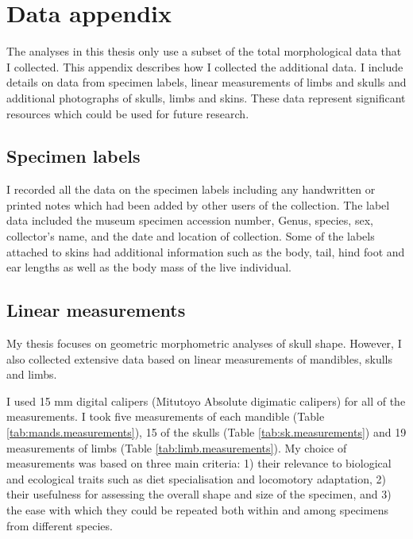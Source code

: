 

\chapter{Data appendix}
\label{appendix}

	The analyses in this thesis only use a subset of the total morphological data that I collected. This appendix describes how I collected the additional data. I include details on data from specimen labels, linear measurements of limbs and skulls and additional photographs of skulls, limbs and skins. These data represent significant resources which could be used for future research.
\section{Specimen labels}

	I recorded all the data on the specimen labels including any handwritten or printed notes which had been added by other users of the collection. The label data included the museum specimen accession number, Genus, species, sex, collector's name, and the date and location of collection. Some of the labels attached to skins had additional information such as the body, tail, hind foot and ear lengths as well as the body mass of the live individual. 
\section{Linear measurements}
\label{sect:measurements}

	My thesis focuses on geometric morphometric analyses of skull shape. However, I also collected extensive data based on linear measurements of mandibles, skulls and limbs. 
	
	I used 15 mm digital calipers (Mitutoyo Absolute digimatic calipers) for all of the measurements. I took five measurements of each mandible (Table \ref{tab:mands.measurements}), 15 of the skulls (Table \ref{tab:sk.measurements}) and 19 measurements of limbs (Table \ref{tab:limb.measurements}). My choice of  measurements was based on three main criteria: 1) their relevance to biological and ecological traits such as diet specialisation and locomotory adaptation, 2) their usefulness for assessing the overall shape and size of the specimen, and 3) the ease with which they could be repeated both within and among specimens from different species. 

